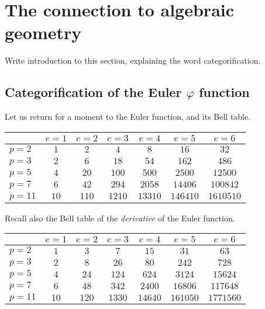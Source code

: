 
\section{The connection to algebraic geometry}

Write introduction to this section, explaining the word categorification.

\subsection{Categorification of the Euler $\varphi$ function}

Let us return for a moment to the Euler function, and its Bell table.

\begin{center}
\begin{tabular}{| l | | c | c | c | c | c | c |}
\hline
& $e = 1$ & $e = 2$ & $e = 3$ & $e = 4$ & $e = 5$ & $e = 6$\\
\hline
\hline
$p = 2$ & $1$ & $2$ & $4$ & $8$ & $16$ & $32$ \\
\hline
$p = 3$ & $2$ & $6$ & $18$ & $54$ & $162$ & $486$ \\
\hline
$p = 5$ & $4$ & $20$ & $100$ & $500$ & $2500$ & $12500$ \\
\hline
$p = 7$ & $6$ & $42$ & $294$ & $2058$ & $14406$ & $100842$ \\
\hline
$p = 11$ & $10$ & $110$ & $1210$ & $13310$ & $146410$ & $1610510$ \\
\hline
\end{tabular}
\end{center}

Recall also the Bell table of the \emph{derivative} of the Euler function.

\vskip10pt
\begin{center}
\begin{tabular}{| l | | c | c | c | c | c | c |}
\hline
& $e = 1$ & $e = 2$ & $e = 3$ & $e = 4$ & $e = 5$ & $e = 6$\\
\hline
\hline
$p = 2$ & $1$ & $3$ & $7$ & $15$ & $31$ & $63$ \\
\hline
$p = 3$ & $2$ & $8$ & $26$ & $80$ & $242$ & $728$ \\
\hline
$p = 5$ & $4$ & $24$ & $124$ & $624$ & $3124$ & $15624$ \\
\hline
$p = 7$ & $6$ & $48$ & $342$ & $2400$ & $16806$ & $117648$ \\
\hline
$p = 11$ & $10$ & $120$ & $1330$ & $14640$ & $161050$ & $1771560$ \\
\hline
\end{tabular}
\end{center}

